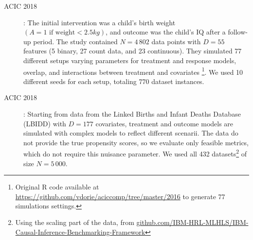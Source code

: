 \documentclass[11pt]{article}
\let\cite=\supercite
\begin{document}
\begin{description}
    \item[ACIC 2018] \cite{dorie_automated_2019}:  The initial intervention was a child’s birth
        weight $(A = 1 \text{ if weight} < 2.5 kg)$, and outcome was the child’s
        IQ after a follow-up period. The study contained $N=4\,802$ data
        points with $D=55$ features (5 binary, 27 count data, and 23
        continuous). They simulated 77 different setups varying parameters
        for treatment and response models, overlap, and interactions between treatment and
        covariates \footnote{Original R code available at
            \url{https://github.com/vdorie/aciccomp/tree/master/2016}
            to generate 77 simulations settings.}. We used 10 different seeds
        for each setup, totaling 770 dataset instances.

    \item[ACIC 2018] \cite{shimoni_benchmarking_2018}: Starting from data from
        the Linked Births and Infant Deaths Database (LBIDD)
        \cite{macdorman_infant_1998} with $D=177$ covariates, treatment and
        outcome models are simulated with complex models to reflect different
        scenarii. The data do not provide the true propensity scores, so we
        evaluate only feasible metrics, which do not require this nuisance
        parameter. We used all 432 datasets\footnote{Using the scaling part of
            the data, from
            \href{https://github.com/IBM-HRL-MLHLS/IBM-Causal-Inference-Benchmarking-Framework}{github.com/IBM-HRL-MLHLS/IBM-Causal-Inference-Benchmarking-Framework}}
        of size $N=5\,000$.



\end{description}
\end{document}
